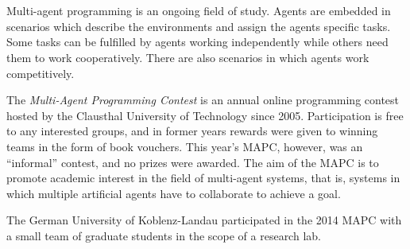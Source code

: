 \section*{}%
Multi-agent programming is an ongoing field of study.
Agents are embedded in scenarios which describe the environments and assign the agents specific tasks.
Some tasks can be fulfilled by agents working independently while others need them to work cooperatively.
There are also scenarios in which agents work competitively.

The \emph{Multi-Agent Programming Contest} is an annual online programming contest hosted by the Clausthal University of Technology since 2005.
Participation is free to any interested groups, and in former years rewards were given to winning teams in the form of book vouchers.
This year's MAPC, however, was an \enquote{informal} contest, and no prizes were awarded.
The aim of the MAPC is to promote academic interest in the field of multi-agent systems, that is, systems in which multiple artificial agents have to collaborate to achieve a goal.

The German University of Koblenz-Landau participated in the 2014 MAPC with a small team of graduate students in the scope of a research lab.
